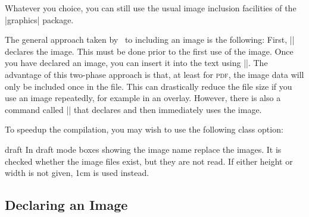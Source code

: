 Whatever you choice, you can still use the usual image inclusion
facilities of the |graphics| package.

The general approach taken by \pgfname\ to including an image is the
following: First, |\pgfdeclareimage| declares the
image. This must be done prior to the first use of the image. Once you
have declared an image, you can insert it into the text using
|\pgfuseimage|. The advantage of this two-phase approach is that, at
least for \textsc{pdf}, the image data will only be included once in the
file. This can drastically reduce the file size if you use an image
repeatedly, for example in an overlay. However, there is also a
command called |\pgfimage| that declares and then immediately uses the
image.

To speedup the compilation, you may wish to use the following class
option:
\begin{packageoption}{draft}
  In draft mode boxes showing the image name replace the
  images. It is checked whether the image files exist, but they are
  not read. If either height or width is not given, 1cm is used
  instead. 
\end{packageoption}

\subsection{Declaring an Image}

